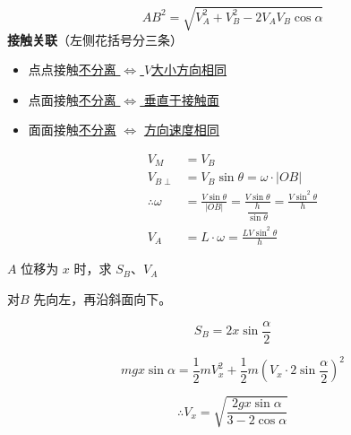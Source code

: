 \[
AB^{2}=\sqrt{V_A^{2}+V_B^{2}-2V_AV_B\cos\alpha}
\]%
\textbf{接触关联}（左侧花括号分三条）
\begin{itemize}
\item 点点接触\quad \underline{不分离 $\Leftrightarrow$ $V$大小方向相同}
\item 点面接触\quad \underline{不分离 $\Leftrightarrow$ 垂直于接触面}%
\item 面面接触\quad \underline{不分离} $\Leftrightarrow$ \underline{方向速度相同}
\end{itemize}
\begin{align*}
V_M&=V_B\\
V_{B\perp}&=V_B\sin\theta=\omega\cdot|OB|\\
\therefore\omega&=\frac{V\sin\theta}{|OB|}=\frac{V\sin\theta}{\dfrac{h}{\sin\theta}}=\frac{V\sin^{2}\theta}{h}\\
V_A&=L\cdot\omega=\frac{LV\sin^{2}\theta}{h}
\end{align*}%

\noindent $A$ 位移为 $x$ 时，求 $S_B$、$V_A$

\noindent 对$B$ 先向左，再沿斜面向下。

\[
S_B=2x\sin\frac{\alpha}{2}
\]

\[
mgx\sin\alpha=\frac12mV_x^{2}+\frac12m\left(V_x\cdot2\sin\frac{\alpha}{2}\right)^{2}
\]

\[
\therefore V_x=\sqrt{\frac{2gx\sin\alpha}{3-2\cos\alpha}}
\]
